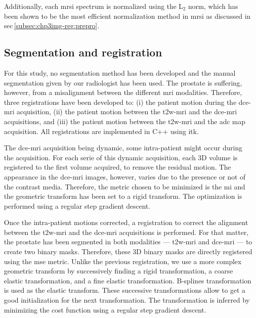 Additionally, each \ac{mrsi} spectrum is normalized using the L$_2$ norm, which has been shown to be the most efficient normalization method in \ac{mrsi} as discussed in \acs{sec}\,\ref{subsec:chp3img-reg:prepro}.

\subsection{Segmentation and registration}\label{subsec:chp6:method:Seg-Reg}

For this study, no segmentation method has been developed and the manual segmentation given by our radiologist has been used.
The prostate is suffering, however, from a misalignment between the different \ac{mri} modalities.
Therefore, three registrations have been developed to: (i) the patient motion during the \ac{dce}-\ac{mri} acquisition, (ii) the patient motion between the \ac{t2w}-\ac{mri} and the \ac{dce}-\ac{mri} acquisitions, and (iii) the patient motion between the \ac{t2w}-\ac{mri} and the \ac{adc} map acquisition.
All registrations are implemented in C++ using \ac{itk}.

The \ac{dce}-\ac{mri} acquisition being dynamic, some intra-patient might occur during the acquisition.
For each serie of this dynamic acquisition, each 3D volume is registered to the first volume acquired, to remove the residual motion.
The appearance in the \ac{dce}-\ac{mri} images, however, varies due to the presence or not of the contrast media.
Therefore, the metric chosen to be minimized is the \ac{mi} and the geometric transform has been set to a rigid transform.
The optimization is performed using a regular step gradient descent.

Once the intra-patient motions corrected, a registration to correct the alignment between the \ac{t2w}-\ac{mri} and the \ac{dce}-\ac{mri} acquisitions is performed.
For that matter, the prostate has been segmented in both modalities --- \ac{t2w}-\ac{mri} and \ac{dce}-\ac{mri} --- to create two binary masks.
Therefore, these 3D binary masks are directly registered using the \ac{mse} metric.
Unlike the previous registration, we use a more complex geometric transform by successively finding a rigid transformation, a coarse elastic transformation, and a fine elastic transformation.
B-splines transformation is used as the elastic transform.
These successive transformations allow to get a good initialization for the next transformation.
The transformation is inferred by minimizing the cost function using a regular step gradient descent.

